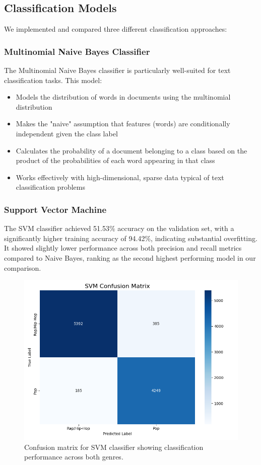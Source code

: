 \documentclass[conference]{IEEEtran}
\begin{document}
\subsection{Classification Models}
We implemented and compared three different classification approaches:

\subsubsection{Multinomial Naive Bayes Classifier}
The Multinomial Naive Bayes classifier is particularly well-suited for text classification tasks. This model:
\begin{itemize}
\item Models the distribution of words in documents using the multinomial distribution
\item Makes the "naive" assumption that features (words) are conditionally independent given the class label
\item Calculates the probability of a document belonging to a class based on the product of the probabilities of each word appearing in that class
\item Works effectively with high-dimensional, sparse data typical of text classification problems
\end{itemize}

\subsubsection{Support Vector Machine}
The SVM classifier achieved 51.53\% accuracy on the validation set, with a significantly higher training accuracy of 94.42\%, indicating substantial overfitting. It showed slightly lower performance across both precision and recall metrics compared to Naive Bayes, ranking as the second highest performing model in our comparison.

\begin{figure}[htbp]
\centerline{\includegraphics[width=0.9\columnwidth]{plots/svm_confusion_matrix.png}}
\caption{Confusion matrix for SVM classifier showing classification performance across both genres.}
\label{fig:svm_confusion}
\end{figure}
\end{document}
